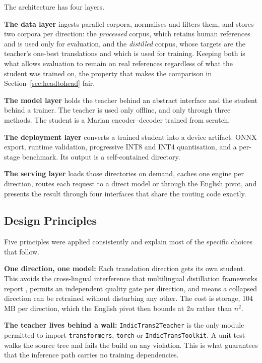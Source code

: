 The architecture has four layers.

\textbf{The data layer} ingests parallel corpora, normalises and filters them,
and stores two corpora per direction: the \emph{processed} corpus, which retains
human references and is used only for evaluation, and the \emph{distilled}
corpus, whose targets are the teacher's one-best translations and which is used
for training. Keeping both is what allows evaluation to remain on real
references regardless of what the student was trained on, the property that
makes the comparison in Section~\ref{sec:headtohead} fair.

\textbf{The model layer} holds the teacher behind an abstract interface and the
student behind a trainer. The teacher is used only offline, and only through
three methods. The student is a Marian encoder--decoder trained from scratch.

\textbf{The deployment layer} converts a trained student into a device artifact:
ONNX export, runtime validation, progressive INT8 and INT4 quantisation, and a
per-stage benchmark. Its output is a self-contained directory.

\textbf{The serving layer} loads those directories on demand, caches one engine
per direction, routes each request to a direct model or through the English
pivot, and presents the result through four interfaces that share the routing
code exactly.

\subsection{Design Principles}
\label{subsec:principles}

Five principles were applied consistently and explain most of the specific
choices that follow.

\textbf{One direction, one model:} Each translation direction gets its own
student. This avoids the cross-lingual interference that multilingual
distillation frameworks report \cite{ref:aiokd}, permits an independent quality
gate per direction, and means a collapsed direction can be retrained without
disturbing any other. The cost is storage, 104\,MB per direction, which the
English pivot then bounds at $2n$ rather than $n^2$.

\textbf{The teacher lives behind a wall:} \texttt{IndicTrans2Teacher} is the only
module permitted to import \texttt{transformers}, \texttt{torch} or
\texttt{IndicTransToolkit}. A unit test walks the source tree and fails the
build on any violation. This is what guarantees that the inference path carries
no training dependencies.

